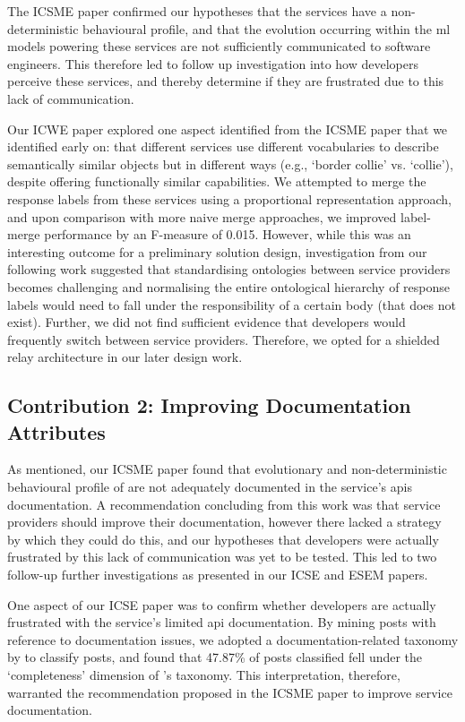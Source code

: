 The ICSME paper confirmed our hypotheses that the services have a non-deterministic behavioural profile, and that the evolution occurring within the \gls{ml} models powering these services are not sufficiently communicated to software engineers. This therefore led to follow up investigation into how developers perceive these services, and thereby determine if they are frustrated due to this lack of communication. 

Our ICWE paper explored one aspect identified from the ICSME paper that we identified early on: that different services use different vocabularies to describe semantically similar objects but in different ways (e.g., `border collie' vs. `collie'), despite offering functionally similar capabilities. We attempted to merge the response labels from these services using a proportional representation approach, and upon comparison with more naive merge approaches, we improved label-merge performance by an F-measure of 0.015. However, while this was an interesting outcome for a preliminary solution design, investigation from our following work suggested that standardising ontologies between service providers becomes challenging and normalising the entire ontological hierarchy of response labels would need to fall under the responsibility of a certain body (that does not exist). Further, we did not find sufficient evidence that developers would frequently switch between service providers. Therefore, we opted for a shielded relay architecture in our later design work.  

\subsection{Contribution 2: Improving Documentation Attributes}

As mentioned, our ICSME paper found that evolutionary and non-deterministic behavioural profile of are not adequately documented in the service's \glspl{api} documentation. A recommendation concluding from this work was that service providers should improve their documentation, however there lacked a strategy by which they could do this, and our hypotheses that developers were actually frustrated by this lack of communication was yet to be tested. This led to two follow-up further investigations as presented in our ICSE and ESEM papers.

One aspect of our ICSE paper was to confirm whether developers are actually frustrated with the service's limited \gls{api} documentation. By mining  posts with reference to documentation issues, we adopted a \citeyear{Aghajani:2019bo} documentation-related taxonomy by \citet{Aghajani:2018et} to classify posts, and found that 47.87\% of posts classified fell under the `completeness' dimension of \citeauthor{Aghajani:2018et}'s taxonomy. This interpretation, therefore, warranted the recommendation proposed in the ICSME paper to improve service documentation. 

